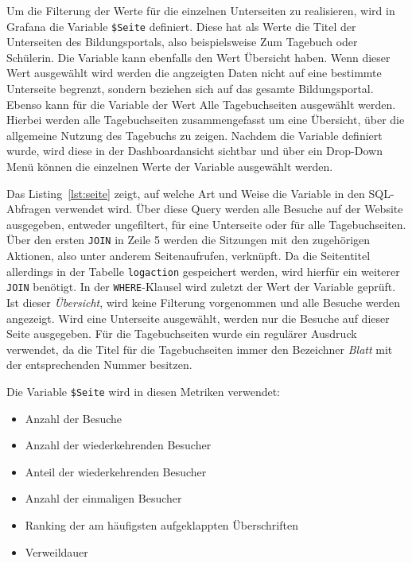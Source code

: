 Um die Filterung der Werte für die einzelnen Unterseiten zu realisieren, wird in Grafana die Variable \texttt{\$Seite} definiert. Diese hat als Werte die Titel der Unterseiten des Bildungsportals, also beispielsweise \glqq Zum Tagebuch\grqq{} oder \glqq Schülerin\grqq{}. Die Variable kann ebenfalls den Wert \glqq Übersicht\grqq{} haben. Wenn dieser Wert ausgewählt wird werden die angzeigten Daten nicht auf eine bestimmte Unterseite begrenzt, sondern beziehen sich auf das gesamte Bildungsportal. Ebenso kann für die Variable der Wert \glqq Alle Tagebuchseiten\grqq{} ausgewählt werden. Hierbei werden alle Tagebuchseiten zusammengefasst um eine Übersicht, über die allgemeine Nutzung des Tagebuchs zu zeigen. Nachdem die Variable definiert wurde, wird diese in der Dashboardansicht sichtbar und über ein Drop-Down Menü können die einzelnen Werte der Variable ausgewählt werden.

\begin{figure}[H]
    \centering
    \begin{minipage}{\textwidth}
        
    \end{minipage}
\end{figure}

Das Listing~\ref{lst:seite} zeigt, auf welche Art und Weise die Variable in den SQL-Abfragen verwendet wird. Über diese Query werden alle Besuche auf der Website ausgegeben, entweder ungefiltert, für eine Unterseite oder für alle Tagebuchseiten. Über den ersten \texttt{JOIN} in Zeile 5 werden die Sitzungen mit den zugehörigen Aktionen, also unter anderem Seitenaufrufen, verknüpft. Da die Seitentitel allerdings in der Tabelle \texttt{log\textunderscore action} gespeichert werden, wird hierfür ein weiterer \texttt{JOIN} benötigt. In der {\texttt{WHERE}-Klausel} wird zuletzt der Wert der Variable geprüft. Ist dieser \textit{Übersicht}, wird keine Filterung vorgenommen und alle Besuche werden angezeigt. Wird eine Unterseite ausgewählt, werden nur die Besuche auf dieser Seite ausgegeben. Für die Tagebuchseiten wurde ein regulärer Ausdruck verwendet, da die Titel für die Tagebuchseiten immer den Bezeichner \textit{Blatt} mit der entsprechenden Nummer besitzen.

Die Variable \texttt{\$Seite} wird in diesen Metriken verwendet: 
\begin{itemize}
    \item Anzahl der Besuche
    \item Anzahl der wiederkehrenden Besucher
    \item Anteil der wiederkehrenden Besucher
    \item Anzahl der einmaligen Besucher
    \item Ranking der am häufigsten aufgeklappten Überschriften
    \item Verweildauer
\end{itemize}

